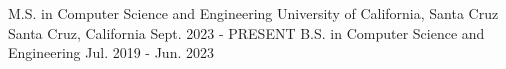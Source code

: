 

\begin{cventries}

  \cventry
    {M.S. in Computer Science and Engineering} %
    {University of California, Santa Cruz} %
    {Santa Cruz, California} %
    {Sept. 2023 - PRESENT} %
    {}
  \vspace{0in}
  \cventry
    {B.S. in Computer Science and Engineering} %
    {} %
    {} %
    {Jul. 2019 - Jun. 2023} %
    {}

\end{cventries}
